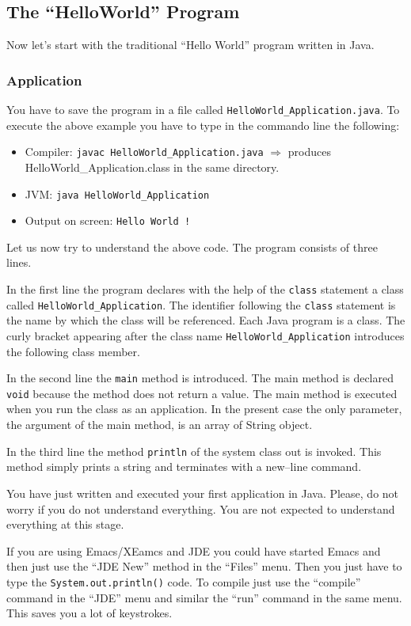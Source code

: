 \subsection{The ``HelloWorld'' Program}
\label{sec:HelloWorld}
Now let's start with the traditional ``Hello World'' program written
in Java.

\subsubsection{Application}

You have to save the program in a file called 
\verb|HelloWorld_Application.java|.
To execute the above example you have to type in the commando line the
following:
\begin{itemize}
\item Compiler: \verb/javac HelloWorld_Application.java/  
  $\Longrightarrow$ produces HelloWorld\_Application.class 
  in the same directory.
\item JVM:  \verb/java HelloWorld_Application/
\item Output on screen: \verb<Hello World !<
\end{itemize}
Let us now try to understand the above code. The program consists of
three lines. 

In the first line the program declares 
with the help of the \texttt{class} statement a class called 
\verb|HelloWorld_Application|. 
The identifier following the \texttt{class} statement is
the name by which the class will be referenced. Each Java program
is a class. The curly bracket appearing after the class name
\verb|HelloWorld_Application| introduces the following class member. 


In the second line the \verb|main| method is introduced. The main
method is declared \verb|void| because the method does not return a
value. The main method is executed when you run the class as an
application. In the present case the only parameter, the argument
of the main method, is an array of String object.

In the third line the method \verb|println| of the system class out
is invoked. This method simply prints a string and terminates with a 
new--line  command.

You have just written and executed your first application in
Java. Please, do not worry if you do not understand everything. You are
not expected to understand everything at this stage.

If you are using Emacs/XEamcs and JDE you could have started Emacs and
then just use the ``JDE New'' method in the ``Files'' menu. Then you
just have to type the \verb|System.out.println()| code. To compile
just use the ``compile'' command in the ``JDE'' menu and similar
the ``run'' command in the same menu. This saves you a lot of keystrokes. 

